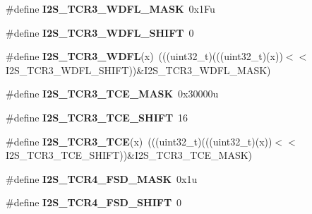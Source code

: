 \begin{DoxyCompactItemize}
\item 
\#define {\bfseries I2\+S\+\_\+\+T\+C\+R3\+\_\+\+W\+D\+F\+L\+\_\+\+M\+A\+SK}~0x1\+Fu\hypertarget{group__I2S__Register__Masks_ga49de2df89ebdb02cdb32c8a15f9ac7b4}{}\label{group__I2S__Register__Masks_ga49de2df89ebdb02cdb32c8a15f9ac7b4}

\item 
\#define {\bfseries I2\+S\+\_\+\+T\+C\+R3\+\_\+\+W\+D\+F\+L\+\_\+\+S\+H\+I\+FT}~0\hypertarget{group__I2S__Register__Masks_ga984179c79c4fc833f32c031c69a33cd9}{}\label{group__I2S__Register__Masks_ga984179c79c4fc833f32c031c69a33cd9}

\item 
\#define {\bfseries I2\+S\+\_\+\+T\+C\+R3\+\_\+\+W\+D\+FL}(x)~(((uint32\+\_\+t)(((uint32\+\_\+t)(x))$<$$<$I2\+S\+\_\+\+T\+C\+R3\+\_\+\+W\+D\+F\+L\+\_\+\+S\+H\+I\+FT))\&I2\+S\+\_\+\+T\+C\+R3\+\_\+\+W\+D\+F\+L\+\_\+\+M\+A\+SK)\hypertarget{group__I2S__Register__Masks_ga61d01cab13a8777ad0e326259faeb685}{}\label{group__I2S__Register__Masks_ga61d01cab13a8777ad0e326259faeb685}

\item 
\#define {\bfseries I2\+S\+\_\+\+T\+C\+R3\+\_\+\+T\+C\+E\+\_\+\+M\+A\+SK}~0x30000u\hypertarget{group__I2S__Register__Masks_ga27bcb7b4d391b96f7fd8f566579bf7e2}{}\label{group__I2S__Register__Masks_ga27bcb7b4d391b96f7fd8f566579bf7e2}

\item 
\#define {\bfseries I2\+S\+\_\+\+T\+C\+R3\+\_\+\+T\+C\+E\+\_\+\+S\+H\+I\+FT}~16\hypertarget{group__I2S__Register__Masks_gab6791fd5b9271db39f4f91173ed3c30d}{}\label{group__I2S__Register__Masks_gab6791fd5b9271db39f4f91173ed3c30d}

\item 
\#define {\bfseries I2\+S\+\_\+\+T\+C\+R3\+\_\+\+T\+CE}(x)~(((uint32\+\_\+t)(((uint32\+\_\+t)(x))$<$$<$I2\+S\+\_\+\+T\+C\+R3\+\_\+\+T\+C\+E\+\_\+\+S\+H\+I\+FT))\&I2\+S\+\_\+\+T\+C\+R3\+\_\+\+T\+C\+E\+\_\+\+M\+A\+SK)\hypertarget{group__I2S__Register__Masks_ga1daa102ea7a383ef2562a20c3be3d06d}{}\label{group__I2S__Register__Masks_ga1daa102ea7a383ef2562a20c3be3d06d}

\item 
\#define {\bfseries I2\+S\+\_\+\+T\+C\+R4\+\_\+\+F\+S\+D\+\_\+\+M\+A\+SK}~0x1u\hypertarget{group__I2S__Register__Masks_ga895aea8d5cc09529dfca99dc5c511644}{}\label{group__I2S__Register__Masks_ga895aea8d5cc09529dfca99dc5c511644}

\item 
\#define {\bfseries I2\+S\+\_\+\+T\+C\+R4\+\_\+\+F\+S\+D\+\_\+\+S\+H\+I\+FT}~0\hypertarget{group__I2S__Register__Masks_ga61e4999938fd48b7f2f316e1563277ec}{}\label{group__I2S__Register__Masks_ga61e4999938fd48b7f2f316e1563277ec}


\end{DoxyCompactItemize}
